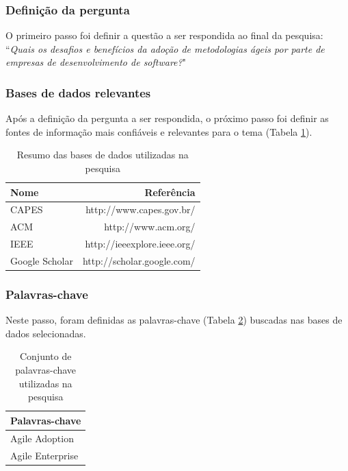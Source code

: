 \documentclass[a4paper,11pt]{article}
\begin{document}
		\subsubsection{Definição da pergunta}
			O primeiro passo foi definir a questão a ser respondida ao final da pesquisa: ``\textit{Quais os desafios e benefícios da adoção de metodologias ágeis por parte de empresas de desenvolvimento de software?}"
		\subsubsection{Bases de dados relevantes}
			Após a definição da pergunta a ser respondida, o próximo passo foi definir as fontes de informação mais confiáveis e relevantes para o tema (Tabela \ref{tab:basesDeDados}).
			\begin{table}[H]
				\centering
				\begin{tabular}{ | l | r | } \hline \textbf{Nome} & \textbf{Referência} \\ \hline
					CAPES & http://www.capes.gov.br/ \\ \hline
					ACM & http://www.acm.org/ \\ \hline
					IEEE & http://ieeexplore.ieee.org/ \\ \hline
					Google Scholar & http://scholar.google.com/ \\ \hline
				\end{tabular}
				\caption{Resumo das bases de dados utilizadas na pesquisa}
				\label{tab:basesDeDados}
			\end{table}
		\subsubsection{Palavras-chave}
			Neste passo, foram definidas as palavras-chave (Tabela \ref{tab:palavrasChave}) buscadas nas bases de dados selecionadas.
			\begin{table}[H]
				\centering
				\begin{tabular}{ | l | } \hline \textbf{Palavras-chave} \\ \hline
					Agile Adoption \\ \hline
					Agile Enterprise \\ \hline
				\end{tabular}
				\caption{Conjunto de palavras-chave utilizadas na pesquisa}
				\label{tab:palavrasChave}
			\end{table}
\end{document}
